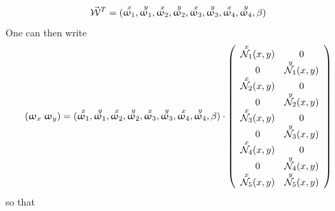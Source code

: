 \[
\vec{\cal W}^T=
(
\overset{\tiny x}{\upomega_1},\overset{\tiny y}{\upomega_1},
\overset{\tiny x}{\upomega_2},\overset{\tiny y}{\upomega_2},
\overset{\tiny x}{\upomega_3},\overset{\tiny y}{\upomega_3},
\overset{\tiny x}{\upomega_4},\overset{\tiny y}{\upomega_4},\beta)
\]
One can then write
\[
(\upomega_x \; \upomega_y)
=
(
\overset{\tiny x}{\upomega_1},\overset{\tiny y}{\upomega_1},
\overset{\tiny x}{\upomega_2},\overset{\tiny y}{\upomega_2},
\overset{\tiny x}{\upomega_3},\overset{\tiny y}{\upomega_3},
\overset{\tiny x}{\upomega_4},\overset{\tiny y}{\upomega_4},\beta)
\cdot
\left(
\begin{array}{cc}
\overset{x}{{\mathcal{N}}_1}(x,y) & 0 \\
0 & \overset{y}{{\mathcal{N}}_1}(x,y) \\
\overset{x}{{\mathcal{N}}_2}(x,y) & 0 \\
0 & \overset{y}{{\mathcal{N}}_2}(x,y) \\
\overset{x}{{\mathcal{N}}_3}(x,y) & 0 \\
0 & \overset{y}{{\mathcal{N}}_3}(x,y) \\
\overset{x}{{\mathcal{N}}_4}(x,y) & 0 \\
0 & \overset{y}{{\mathcal{N}}_4}(x,y) \\
\overset{x}{{\mathcal{N}}_5}(x,y)  & \overset{y}{{\mathcal{N}}_5}(x,y) 
\end{array}
\right)
\]
so that 
